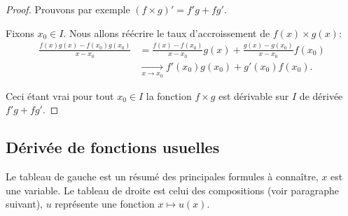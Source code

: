 \documentclass[class=report,crop=false]{standalone}
\begin{document}
\begin{proof}
Prouvons par exemple $(f \times g)' = f'g+fg'$.

Fixons $x_0 \in I$. Nous allons réécrire le taux d'accroissement de $f(x)\times g(x)$:
\begin{align*}
\frac{f(x)g(x)-f(x_0)g(x_0)}{x-x_0}
&=\frac{f(x)-f(x_0)}{x-x_0} g(x)+\frac{g(x)-g(x_0)}{x-x_0}f(x_0)\\
&\xrightarrow[x\to x_0]{} f'(x_0)g(x_0)+g'(x_0)f(x_0).
\end{align*}

%
%
%

Ceci étant vrai pour tout $x_0 \in I$ la fonction $f\times g$ est dérivable sur $I$ de dérivée $f'g+fg'$.
\end{proof}

\subsection{Dérivée de fonctions usuelles}

Le tableau de gauche est un résumé des principales formules à connaître, $x$ est une variable.
Le tableau de droite est celui des compositions (voir paragraphe suivant), $u$ représente une fonction $x\mapsto u(x)$.
\end{document}
